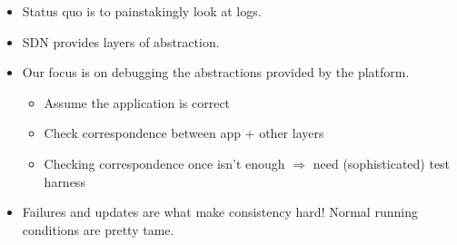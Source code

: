 
\begin{itemize}
\item Status quo is to painstakingly look at logs. 
\item SDN provides layers of abstraction.
\item Our focus is on debugging the abstractions provided by the platform.
\begin{itemize}
  \item Assume the application is correct
  \item Check correspondence between app + other layers
  \item Checking correspondence once isn't enough $\Rightarrow$ need (sophisticated) test harness
\end{itemize}

\item Failures and updates are what make consistency hard! Normal running conditions are pretty tame.

\end{itemize}
